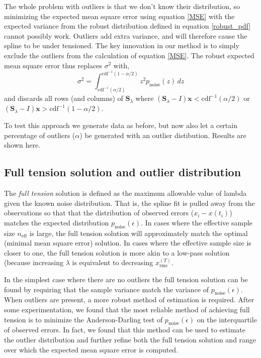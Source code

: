 \documentclass[10pt,journal]{IEEEtran}
\begin{document}
The whole problem with outliers is that we don't know their distribution, so minimizing the expected mean square error using equation \ref{MSE} with the expected variance from the robust distribution defined in equation \ref{robust_pdf} cannot possibly work. Outliers add extra variance, and will therefore cause the spline to be under tensioned. The key innovation in our method is to simply exclude the outliers from the calculation of equation \ref{MSE}. The robust expected mean square error thus replaces $\sigma^2$ with,
\begin{equation}
    \sigma^2 = \int_{\textrm{cdf}^{-1}(\alpha/2)}^{\textrm{cdf}^{-1}(1-\alpha/2)} z^2 p_{\textrm{noise}}(z) \, dz
\end{equation}
and discards all rows (and columns) of $\mathbf{S}_\lambda$ where $\left(\mathbf{S}_\lambda - I\right)\mathbf{x}<\textrm{cdf}^{-1}(\alpha/2)$ or $\left(\mathbf{S}_\lambda - I\right)\mathbf{x}>\textrm{cdf}^{-1}(1-\alpha/2)$.

To test this approach we generate data as before, but now also let a certain percentage of outliers ($\alpha$) be generated with an outlier distibution. Results are shown here.

\subsection{Full tension solution and outlier distribution}
\label{sec:full_tension}

The \emph{full tension} solution is defined as the maximum allowable value of lambda given the known noise distribution. That is, the spline fit is pulled away from the observations so that that the distribution of observed errors ($x_i-x(t_i)$) matches the expected distribution $p_{\textrm{noise}}(\epsilon)$. In cases where the effective sample size $n_\textrm{eff}$ is large, the full tension solution will approximately match the optimal (minimal mean square error) solution. In cases where the effective sample size is closer to one, the full tension solution is more akin to a low-pass solution (because increasing $\lambda$ is equivalent to decreasing $x^{(T)}_\textrm{rms}$.

In the simplest case where there are no outliers the full tension solution can be found by requiring that the sample variance match the variance of $p_{\textrm{noise}}(\epsilon)$. When outliers are present, a more robust method of estimation is required. After some experimentation, we found that the most reliable method of achieving full tension is to minimize the Anderson-Darling test of $p_{\textrm{noise}}(\epsilon)$ on the interquartile of observed errors. In fact, we found that this method can be used to estimate the outlier distribution and further refine both the full tension solution and range over which the expected mean square error is computed.
\end{document}
